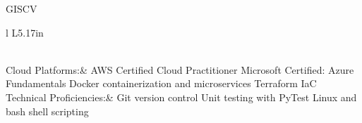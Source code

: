 \documentclass[letterpaper]{article}
\newenvironment{skillslist}
        {
            \hspace*{-0.07in}\begin{tabular}[t]{ l L{5.17in} }
        }{
            \end{tabular}
        }
\newcommand{\impt}[1]{\uline{#1}}
\begin{document}
\begin{taggedblock}{GISCV}
\begin{skillslist}
                \\
            Cloud Platforms:&
                AWS Certified Cloud Practitioner \linebreak
                Microsoft Certified: Azure Fundamentals \linebreak
                Docker containerization and microservices \linebreak
                Terraform IaC \linebreak
                \\
            Technical Proficiencies:&
                Git version control \linebreak
                Unit testing with PyTest \linebreak
                Linux and bash shell scripting \linebreak
                \\
        \end{skillslist}
    \end{taggedblock}
\end{document}
